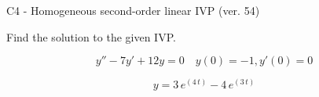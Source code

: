 \begin{exercise}
  \begin{exerciseTitle}C4 - Homogeneous second-order linear IVP (ver. 54)\end{exerciseTitle}
  \begin{exerciseStatement}
    
Find the solution to the given IVP.

    
\[y''-7y'+12y = 0 \hspace{1em} y(0) = -1 , y'(0) = 0\]

  \end{exerciseStatement}
  \begin{exerciseAnswer}
    
\[y= 3 \, e^{\left(4 \, t\right)} - 4 \, e^{\left(3 \, t\right)}\]

  \end{exerciseAnswer}
\end{exercise}